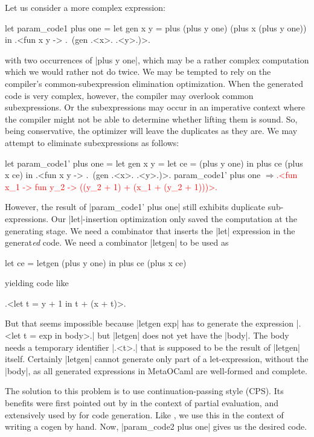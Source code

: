 \documentclass{elsart}
\newcommand{\evalresult}[1]{\ensuremath{\Longrightarrow}\textcolor{red}{#1}}
\begin{document}
Let us consider a more complex expression:
\begin{code}
let param_code1 plus one =
  let gen x y = plus (plus y one) (plus x (plus y one)) in
  .<fun x y -> .~(gen .<x>. .<y>.)>.
\end{code}
with two occurrences of |plus y one|,
which may be a rather complex computation which we would rather not do
twice. We may be tempted to rely on the compiler's
common-subexpression elimination optimization. When the generated code is
very complex, however, the compiler may overlook common subexpressions.  Or the
subexpressions may occur in an imperative context where the compiler
might not be able to determine whether lifting them is sound. So, being
conservative, the optimizer will leave the duplicates as they are. 
We may attempt to eliminate subexpressions as follows: 
\begin{code}[commandchars=\\\{\}]
let param_code1' plus one =
  let gen x y = let ce = (plus y one) in  plus ce (plus x ce) in
  .<fun x y -> .~(gen .<x>. .<y>.)>.
param_code1' plus one
\evalresult{.<fun x_1 -> fun y_2 -> ((y_2 + 1) + (x_1 + (y_2 + 1)))>.}
\end{code}
However,
the result of |param_code1' plus one| still exhibits duplicate
sub-expressions.  Our |let|-insertion optimization only saved the
computation at the generating stage.  We need a combinator that
inserts the |let| expression in the generat\emph{ed} code. We need a
combinator |letgen| to be used as
\begin{code}
let ce = letgen (plus y one) in plus ce (plus x ce)
\end{code}
yielding code like 
\begin{code}
.<let t = y + 1 in t + (x + t)>.
\end{code}
But that seems impossible because |letgen exp| has to generate
the expression |.<let t = exp in body>.| but |letgen| does not yet
have the |body|. The body needs a temporary identifier |.<t>.|
that is supposed to be the result of |letgen| itself.  Certainly
|letgen| cannot generate only part of a let-expression, without the
|body|, as all generated expressions in MetaOCaml are well-formed and
complete.

The solution to this problem is to use continuation-passing style (CPS). Its
benefits were first pointed out by \cite{Bondorf:92} in the context of partial
evaluation, and extensively used by \cite{SwadiMonadic06,KiselyovTaha} for
code generation. Like \cite{conf/pepm/BondorfD94}, we use this in the 
context of writing a cogen by hand.  Now, |param_code2 plus one| gives us the
desired code.
\end{document}
